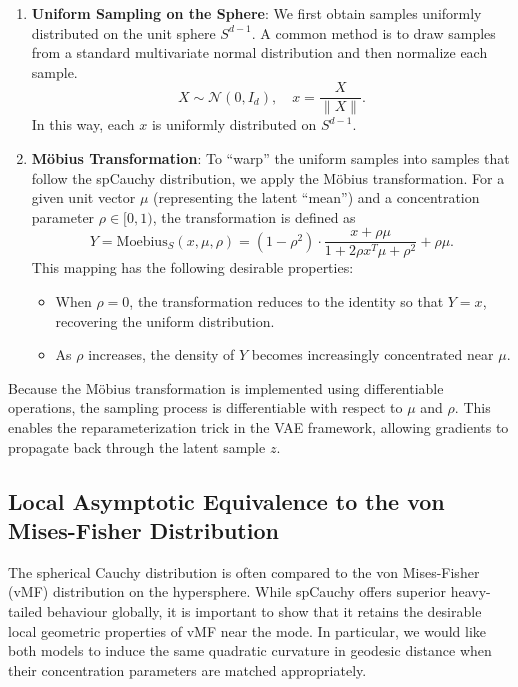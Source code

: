 \documentclass{article}
\begin{document}
\begin{enumerate}
  \item \textbf{Uniform Sampling on the Sphere}:  
    We first obtain samples uniformly distributed on the unit sphere \( S^{d-1} \). A common method is to draw samples from a standard multivariate normal distribution and then normalize each sample.
    \[
    X \sim \mathcal{N}(0, I_d), \quad x = \frac{X}{\|X\|}.
    \]
    In this way, each \( x \) is uniformly distributed on \( S^{d-1} \).

  \item \textbf{Möbius Transformation}:  
    To ``warp'' the uniform samples into samples that follow the spCauchy distribution, we apply the M\"obius transformation. For a given unit vector \(\mu\) (representing the latent “mean”) and a concentration parameter \(\rho \in [0,1)\), the transformation is defined as
    \[
    Y = \mathrm{Moebius}_S(x, \mu, \rho) = (1-\rho^2) \cdot \frac{x + \rho\mu}{1 + 2\rho x^T\mu + \rho^2} + \rho\mu.
    \]
    This mapping has the following desirable properties:
    \begin{itemize}
        \item When \(\rho=0\), the transformation reduces to the identity so that \(Y = x\), recovering the uniform distribution.
        \item As \(\rho\) increases, the density of \(Y\) becomes increasingly concentrated near \(\mu\).
    \end{itemize}
\end{enumerate}


Because the Möbius transformation is implemented using differentiable operations, the sampling process is differentiable with respect to \(\mu\) and \(\rho\). This enables the reparameterization trick in the VAE framework, allowing gradients to propagate back through the latent sample \(z\).

\subsection{Local Asymptotic Equivalence to the von Mises-Fisher Distribution}
\label{sec:local-vmf}

The spherical Cauchy distribution is often compared to the von Mises-Fisher (vMF)
distribution on the hypersphere. While spCauchy offers superior heavy-tailed behaviour
globally, it is important to show that it retains the desirable local geometric
properties of vMF near the mode. In particular, we would like both models to induce
the same quadratic curvature in geodesic distance when their concentration parameters
are matched appropriately.
\end{document}
